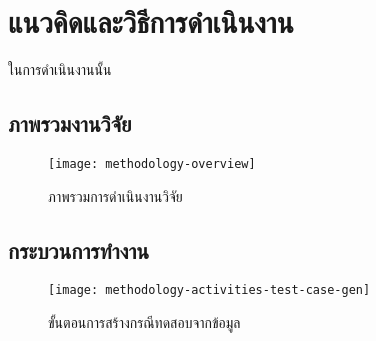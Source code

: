 \section{แนวคิดและวิธีการดำเนินงาน}

ในการดำเนินงานนั้น

\clearpage

\subsection{ภาพรวมงานวิจัย}
\begin{landscape}
    \begin{figure}[ht!]
        \centering
        \texttt{[image: methodology-overview]}
        \caption{ภาพรวมการดำเนินงานวิจัย}
        \label{fig:methodologyoverview}
    \end{figure}
\end{landscape}

\subsection{กระบวนการทำงาน}
\begin{figure}[ht!]
    \centering
    \texttt{[image: methodology-activities-test-case-gen]}
    \caption{ขั้นตอนการสร้างกรณีทดสอบจากข้อมูล}
    \label{fig:methodologyactivity}
\end{figure}
